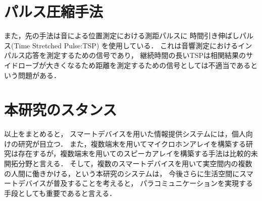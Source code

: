 \section{パルス圧縮手法}

また，先の手法は音による位置測定における測距パルスに
時間引き伸ばしパルス(Time Stretched Pulse:TSP) を使用している．
これは音響測定におけるインパルス応答を測定するための信号であり\cite{Aoshima}，
継続時間の長いTSPは相関結果のサイドローブが大きくなるため距離を測定するための信号としては不適当であるという問題がある．


\section{本研究のスタンス}

以上をまとめると，
スマートデバイスを用いた情報提供システムには，個人向けの研究が目立つ．
また，複数端末を用いてマイクロホンアレイを構築する研究は存在するが，複数端末を用いてのスピーカアレイを構築する手法は比較的未開拓分野と言える．
そして，複数のスマートデバイスを用いて実空間内の複数の人間に働きかける，という本研究のシステムは，
今後さらに生活空間にスマートデバイスが普及することを考えると，
パラコミュニケーションを実現する手段としても重要であると言える．


